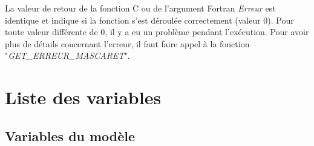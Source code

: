\documentclass[a4paper,11pt]{article}
\begin{document}
 \vspace{0.5cm}
 
 La valeur de retour de la fonction C ou de l'argument Fortran \textit{Erreur} est identique et indique si la fonction s'est d\'eroul\'ee correctement (valeur 0). Pour toute valeur diff\'erente de 0, il y a eu un probl\`eme pendant l'ex\'ecution. Pour avoir plus de d\'etails concernant l'erreur, il faut faire appel \`a la fonction "\textit{GET\_ERREUR\_MASCARET}".

\section{Liste des variables}

\subsection{Variables du mod\`ele}
\end{document}

